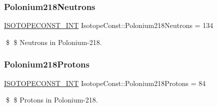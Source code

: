 \subsubsection{\texorpdfstring{Polonium218\+Neutrons}{Polonium218Neutrons}}
{\footnotesize\ttfamily \mbox{\hyperlink{group___isotope_const-_macros_ga5f18360b3e99483a35c32d789e62621c}{I\+S\+O\+T\+O\+P\+E\+C\+O\+N\+S\+T\+\_\+\+I\+NT}} Isotope\+Const\+::\+Polonium218\+Neutrons = 134}

\$ \$ Neutrons in Polonium-\/218. \mbox{\label{group___isotope_const-_polonium-_po218_ga956953c08159d6945bf2e7cf855d42f8}} 
\subsubsection{\texorpdfstring{Polonium218\+Protons}{Polonium218Protons}}
{\footnotesize\ttfamily \mbox{\hyperlink{group___isotope_const-_macros_ga5f18360b3e99483a35c32d789e62621c}{I\+S\+O\+T\+O\+P\+E\+C\+O\+N\+S\+T\+\_\+\+I\+NT}} Isotope\+Const\+::\+Polonium218\+Protons = 84}

\$ \$ Protons in Polonium-\/218. 